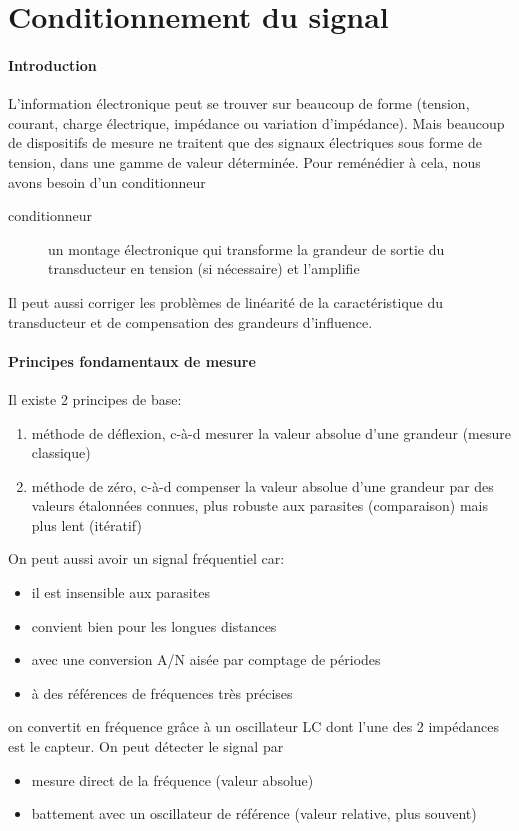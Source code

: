\chapter{Conditionnement du signal}
\subsubsection{Introduction}
L'information électronique peut se trouver sur beaucoup de forme (tension, courant, charge électrique, impédance ou variation d'impédance). Mais beaucoup de dispositifs de mesure ne traitent que des signaux électriques sous forme de tension, dans une gamme de valeur déterminée. Pour reménédier à cela, nous avons besoin d'un conditionneur
\begin{description}
	\item[conditionneur] un montage électronique qui transforme la grandeur de sortie du transducteur en tension (si nécessaire) et l'amplifie
\end{description}
Il peut aussi corriger les problèmes de linéarité de la caractéristique du transducteur et de compensation des grandeurs d'influence.
\subsubsection{Principes fondamentaux de mesure}
Il existe 2 principes de base:
\begin{enumerate}
	\item méthode de déflexion, c-à-d mesurer la valeur absolue d'une grandeur (mesure classique)
	\item méthode de zéro, c-à-d compenser la valeur absolue d'une grandeur par des valeurs étalonnées connues, plus robuste aux parasites (comparaison) mais plus lent (itératif)
\end{enumerate}
On peut aussi avoir un signal fréquentiel car:
\begin{itemize}
	\item il est insensible aux parasites
	\item convient bien pour les longues distances
	\item avec une conversion A/N aisée par comptage de périodes
	\item à des références de fréquences très précises
\end{itemize}
on convertit en fréquence grâce à un oscillateur LC dont l'une des 2 impédances est le capteur. On peut détecter le signal par
\begin{itemize}
	\item mesure direct de la fréquence (valeur absolue)
	\item battement avec un oscillateur de référence (valeur relative, plus souvent)
\end{itemize}
